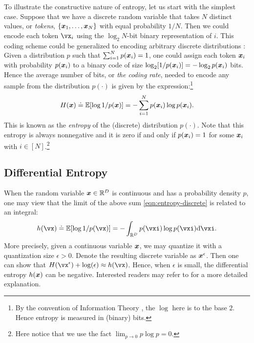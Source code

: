 \documentclass[../../book-main.tex]{subfiles}
\begin{document}
To illustrate the constructive nature of entropy, let us start with the simplest case. Suppose that we have a discrete random variable that takes $N$ distinct values, or \textit{tokens}, $\{\bm{x}_1, \ldots, \bm{x}_N\}$ with equal probability $1/N$. Then we could encode each token \(\vx_{i}\) using the \(\log_2 N\)-bit binary representation of \(i\). This coding scheme could be generalized to encoding arbitrary discrete distributions \cite{Cover-Thomas}: Given a distribution \(p\) such that $\sum_{i=1}^N p(\bm{x}_i) = 1$, one could assign each token $\bm{x}_i$ with probability $p(\bm{x}_i)$ to a binary code of size $\log_2 [1/p(\bm{x}_i)] = - \log_2 p(\bm{x}_i)$ bits. Hence the average number of bits, or {\em the coding rate}, needed to encode any sample from the distribution $p(\cdot)$ is given by the expression:\footnote{By the convention of  Information Theory \cite{Cover-Thomas}, the $\log$ here is to the base $2$. Hence entropy is measured in (binary) bits.}
\begin{equation}
	H(\bm{x}) \doteq \mathbb{E}[\log 1/p(\bm{x})]  = - \sum_{i=1}^N p(\bm{x}_i) \log  p(\bm{x}_i).
	\label{eqn:entropy-discrete}
\end{equation}
This is known as the {\em entropy} of the (discrete) distribution $p(\cdot)$. Note that this entropy is always nonnegative and it is zero if and only if $p(\bm{x}_i) = 1$ for some $\bm{x}_i$ with $i \in [N]$.\footnote{Here notice that we use the fact $\lim_{p\rightarrow 0} p \log p = 0$.}


\subsection{Differential Entropy}

When the random variable $\bm{x} \in \mathbb{R}^{D}$ is continuous and has a probability density $p$, one may view that the limit of the above sum \eqref{eqn:entropy-discrete} is related to an integral:
\begin{equation}
	h(\vx) \doteq \Ex[\log 1/p(\vx)] = - \int_{\R^{D}} p(\vxi) \log p(\vxi) \odif{\vxi}.
	\label{eqn:entropy-differential}
\end{equation}
{More precisely, given a continuous variable $\bm{x}$, we may quantize it with a quantization size $\epsilon > 0$. Denote the resulting discrete variable as $\bm{x}^\epsilon$. Then one can show that $H(\vx^\epsilon) + \log(\epsilon) \approx h(\vx)$. Hence, when $\epsilon$ is small, the differential entropy $h(\bm{x})$ can be negative. Interested readers may refer to \cite{Cover-Thomas} for a more detailed explanation.}
\end{document}
